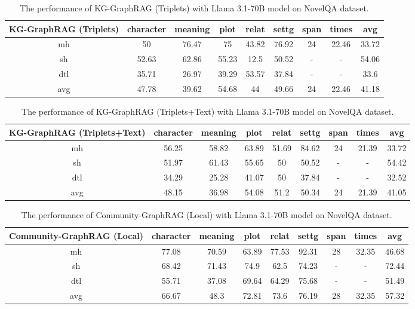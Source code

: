 \begin{table}[!htb]
\caption{The performance of KG-GraphRAG (Triplets) with Llama 3.1-70B model on NovelQA dataset.}
\label{app:tab:triple-70b}
\centering
\begin{tabular}{c|cccccccc}
\hline
KG-GraphRAG (Triplets) & character & meaning & plot  & relat & settg & span & times & avg   \\ \hline
mh                     & 50        & 76.47   & 75    & 43.82 & 76.92 & 24   & 22.46 & 33.72 \\
sh                     & 52.63     & 62.86   & 55.23 & 12.5  & 50.52 & -    & -     & 54.06 \\
dtl                    & 35.71     & 26.97   & 39.29 & 53.57 & 37.84 & -    & -     & 33.6  \\
avg                    & 47.78     & 39.62   & 54.68 & 44    & 49.66 & 24   & 22.46 & 41.18 \\ \hline
\end{tabular}
\end{table}

\begin{table}[!htb]
\caption{The performance of KG-GraphRAG (Triplets+Text) with Llama 3.1-70B model on NovelQA dataset.}
\label{app:tab:tripletext-70b}
\centering
\begin{tabular}{c|cccccccc}
\hline
KG-GraphRAG (Triplets+Text) & character & meaning & plot  & relat & settg & span & times & avg   \\ \hline
mh  & 56.25     & 58.82   & 63.89 & 51.69 & 84.62 & 24   & 21.39 & 33.72 \\
sh  & 51.97     & 61.43   & 55.65 & 50    & 50.52 & -    & -     & 54.42 \\
dtl & 34.29     & 25.28   & 41.07 & 50    & 37.84 & -    & -     & 32.52 \\
avg & 48.15     & 36.98   & 54.08 & 51.2  & 50.34 & 24   & 21.39 & 41.05 \\ \hline
\end{tabular}
\end{table}

\begin{table}[!htb]
\caption{The performance of Community-GraphRAG (Local) with Llama 3.1-70B model on NovelQA dataset.}
\label{app:tab:local-70b}
\centering
\begin{tabular}{c|cccccccc}
\hline
 Community-GraphRAG (Local)   & character & meaning & plot  & relat & settg & span & times & avg   \\ \hline
mh  & 77.08     & 70.59   & 63.89 & 77.53 & 92.31 & 28   & 32.35 & 46.68 \\
sh  & 68.42     & 71.43   & 74.9  & 62.5  & 74.23 & -    & -     & 72.44 \\
dtl & 55.71     & 37.08   & 69.64 & 64.29 & 75.68 & -    & -     & 51.49 \\
avg & 66.67     & 48.3    & 72.81 & 73.6  & 76.19 & 28   & 32.35 & 57.32 \\ \hline
\end{tabular}
\end{table}

